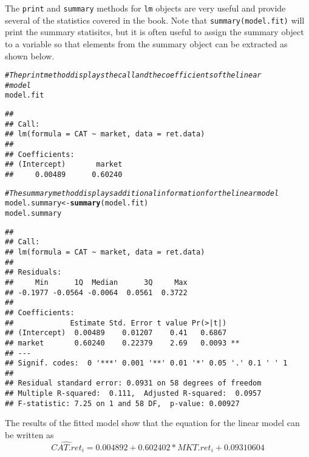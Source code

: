 \documentclass[a4paper]{article}\usepackage[]{graphicx}\usepackage[]{color}
\makeatletter
\newcommand{\hlcom}[1]{\textcolor[rgb]{0.678,0.584,0.686}{\textit{#1}}}%
\newcommand{\hlkwd}[1]{\textcolor[rgb]{0.737,0.353,0.396}{\textbf{#1}}}%
\newenvironment{kframe}{%
 \def\at@end@of@kframe{}%
 \ifinner\ifhmode%
  \def\at@end@of@kframe{\end{minipage}}%
  \begin{minipage}{\columnwidth}%
 \fi\fi%
 \def\FrameCommand##1{\hskip\@totalleftmargin \hskip-\fboxsep
 \colorbox{shadecolor}{##1}\hskip-\fboxsep
     \hskip-\linewidth \hskip-\@totalleftmargin \hskip\columnwidth}%
 \MakeFramed {\advance\hsize-\width
   \@totalleftmargin\z@ \linewidth\hsize
   \@setminipage}}%
 {\par\unskip\endMakeFramed%
 \at@end@of@kframe}
\newenvironment{knitrout}{}{} %
\makeatother
\begin{document}
The \verb"print" and \verb"summary" methods for \verb"lm" objects are very useful and provide several of the statistics covered in the book. Note that \verb"summary(model.fit)" will print the summary statisitcs, but it is often useful to assign the summary object to a variable so that elements from the summary object can be extracted as shown below.
\begin{knitrout}
\color{fgcolor}\begin{kframe}
\begin{alltt}
\hlcom{# The print method displays the call and the coefficients of the linear}
\hlcom{# model}
model.fit
\end{alltt}
\begin{verbatim}
## 
## Call:
## lm(formula = CAT ~ market, data = ret.data)
## 
## Coefficients:
## (Intercept)       market  
##     0.00489      0.60240
\end{verbatim}
\begin{alltt}

\hlcom{# The summary method displays additional information for the linear model}
model.summary <- \hlkwd{summary}(model.fit)
model.summary
\end{alltt}
\begin{verbatim}
## 
## Call:
## lm(formula = CAT ~ market, data = ret.data)
## 
## Residuals:
##     Min      1Q  Median      3Q     Max 
## -0.1977 -0.0564 -0.0064  0.0561  0.3722 
## 
## Coefficients:
##             Estimate Std. Error t value Pr(>|t|)   
## (Intercept)  0.00489    0.01207    0.41   0.6867   
## market       0.60240    0.22379    2.69   0.0093 **
## ---
## Signif. codes:  0 '***' 0.001 '**' 0.01 '*' 0.05 '.' 0.1 ' ' 1
## 
## Residual standard error: 0.0931 on 58 degrees of freedom
## Multiple R-squared:  0.111,	Adjusted R-squared:  0.0957 
## F-statistic: 7.25 on 1 and 58 DF,  p-value: 0.00927
\end{verbatim}
\end{kframe}
\end{knitrout}


The results of the fitted model show that the equation for the linear model can be written as
\begin{equation}
\hat{CAT.ret}_i = 0.004892 + 0.602402 * MKT.ret_i + 0.09310604
\end{equation}
\end{document}
